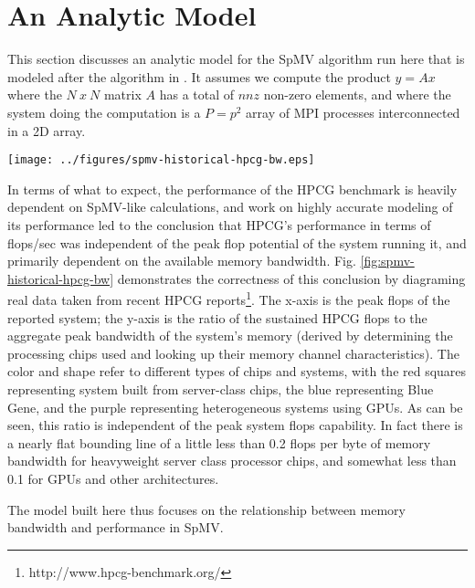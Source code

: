 \section{An Analytic Model}\label{sec:spmv-analytic}

This section discusses an analytic model for the SpMV algorithm run here that is modeled after the algorithm in \cite{techbib:6933066}. It assumes we compute the product $y=Ax$ where the $N~x~N$ matrix $A$ has a total of $nnz$ non-zero elements,  and where the system doing the computation is a $P=p^2$ array of MPI processes interconnected in a 2D array.

\begin{figure*}\begin{centering}
\texttt{[image: ../figures/spmv-historical-hpcg-bw.eps]}
\caption{HPCG Flops per Byte of Memory Bandwidth vs. Peak flops.}
\label{fig:spmv-historical-hpcg-bw}
\end{centering}\end{figure*}


In terms of what to expect, the performance of the HPCG benchmark \cite{techbib:hpcg-snl-dongarra} is heavily dependent on SpMV-like calculations, and work on highly accurate modeling of its performance \cite{techbib:marjanovic2014performance} led to the conclusion that HPCG's performance in terms of flops/sec was independent of the peak flop potential of the system running it, and primarily dependent on the available memory bandwidth. Fig. \ref{fig:spmv-historical-hpcg-bw} demonstrates the correctness of this conclusion by diagraming real data taken from recent HPCG reports\footnote{http://www.hpcg-benchmark.org/}. The x-axis is the peak flops of the reported system; the y-axis is the ratio of the sustained HPCG flops to the aggregate peak bandwidth of the system's memory (derived by determining the processing chips used and looking up their memory channel characteristics). The color and shape refer to different types of chips and systems, with the red squares representing system built from server-class chips, the blue representing Blue Gene, and the purple representing heterogeneous systems using GPUs. As can be seen, this ratio is independent of the peak system flops capability. In fact there is a nearly flat bounding line of a little less than 0.2 flops per byte of memory bandwidth for heavyweight server class processor chips, and somewhat less than 0.1 for GPUs and other architectures.

The model built here thus focuses on the relationship between memory bandwidth and performance in SpMV.

